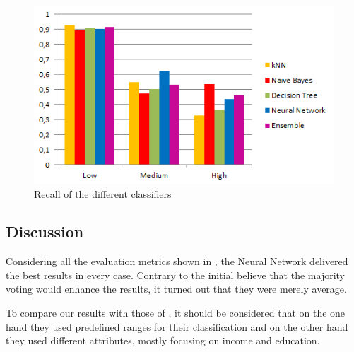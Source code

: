 \begin{figure}[H]
	\centering
	\includegraphics[width=\columnwidth]{../../charts/recall.png}
	\caption{Recall of the different classifiers}
	\label{fig:recall}
\end{figure}

\subsection{Discussion}

Considering all the evaluation metrics shown in , the Neural Network delivered the best results in every case. Contrary to the initial believe that the majority voting would enhance the results, it turned out that they were merely average. 
 
To compare our results with those of \cite{indian}, it should be considered that on the one hand they used predefined ranges for their classification and on the other hand they used different attributes, mostly focusing on income and education.



